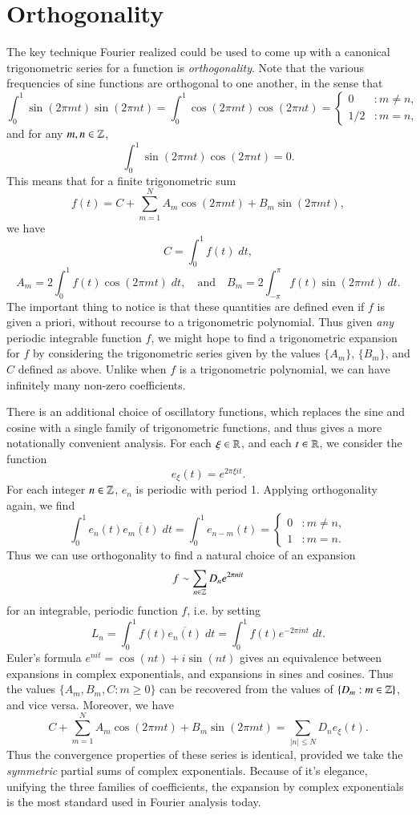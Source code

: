 \section{Orthogonality}

The key technique Fourier realized could be used to come up with a canonical trigonometric series for a function is \emph{orthogonality}. Note that the various frequencies of sine functions are orthogonal to one another, in the sense that
%
\[ \int_0^1 \sin(2 \pi mt) \sin(2\pi nt) = \int_0^1 \cos(2 \pi mt) \cos(2 \pi nt) = \begin{cases} 0 & : m \neq n, \\ 1/2 & : m = n, \end{cases} \]
%
and for any $m,n \in \operatorname{\mathbb{Z}}$,
%
\[ \int_0^1 \sin(2 \pi mt) \cos(2 \pi nt) = 0. \]
%
This means that for a finite trigonometric sum
%
\[ f(t) = C + \sum_{m = 1}^N A_m \cos(2 \pi mt) + B_m \sin(2 \pi mt), \]
%
we have
%
\[ C = \int_0^1 f(t)\; dt, \]
\[ A_m = 2 \int_0^1 f(t) \cos(2 \pi mt)\; dt, \quad\text{and}\quad B_m = 2 \int_{-\pi}^\pi f(t) \sin(2 \pi mt)\; dt. \]
%
The important thing to notice is that these quantities are defined even if $f$ is given a priori, without recourse to a trigonometric polynomial. Thus given \emph{any} periodic integrable function $f$, we might hope to find a trigonometric expansion for $f$ by considering the trigonometric series given by the values $\{ A_m \}$, $\{ B_m \}$, and $C$ defined as above. Unlike when $f$ is a trigonometric polynomial, we can have infinitely many non-zero coefficients.

There is an additional choice of oscillatory functions, which replaces the sine and cosine with a single family of trigonometric functions, and thus gives a more notationally convenient analysis. For each $\xi \in \operatorname{\mathbb{R}}$, and each $t \in \operatorname{\mathbb{R}}$, we consider the function
%
\[ e_\xi(t) = e^{2 \pi \xi i t}. \]
%
For each integer $n \in \operatorname{\mathbb{Z}}$, $e_n$ is periodic with period 1. Applying orthogonality again, we find
%
\[ \int_0^1 e_n(t) \overline{e_m(t)}\; dt = \int_0^1 e_{n-m}(t) = \begin{cases} 0 & : m \neq n, \\ 1 & : m = n. \end{cases}  \]
%
Thus we can use orthogonality to find a natural choice of an expansion
%
\[ f \sim \sum_{n \in \operatorname{\mathbb{Z}}} D_n e^{2 \pi nit} \]
%
for an integrable, periodic function $f$, i.e. by setting
%
\[ L_n = \int_0^1 f(t) \overline{e_n(t)}\; dt = \int_0^1 f(t) e^{- 2 \pi i n t}\; dt. \]
%
Euler's formula $e^{nit} = \cos(nt) + i \sin(nt)$ gives an equivalence between expansions in complex exponentials, and expansions in sines and cosines. Thus the values $\{ A_m, B_m, C : m \geq 0 \}$ can be recovered from the values of $\{ D_m : m \in \operatorname{\mathbb{Z}} \}$, and vice versa. Moreover, we have
%
\[ C + \sum_{m = 1}^N A_m \cos(2 \pi m t) + B_m \sin(2 \pi m t) = \sum_{|n| \leq N} D_n e_\xi(t). \]
%
Thus the convergence properties of these series is identical, provided we take the \emph{symmetric} partial sums of complex exponentials. Because of it's elegance, unifying the three families of coefficients, the expansion by complex exponentials is the most standard used in Fourier analysis today.

